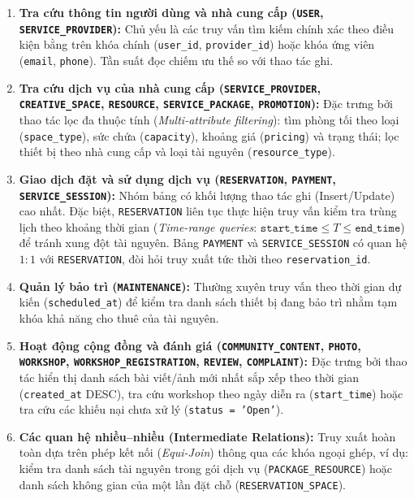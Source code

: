 \begin{enumerate}
    \item \textbf{Tra cứu thông tin người dùng và nhà cung cấp (\texttt{USER}, \texttt{SERVICE\_PROVIDER}):}
    Chủ yếu là các truy vấn tìm kiếm chính xác theo điều kiện bằng trên khóa chính (\texttt{user\_id}, \texttt{provider\_id}) hoặc khóa ứng viên (\texttt{email}, \texttt{phone}). Tần suất đọc chiếm ưu thế so với thao tác ghi.

    \item \textbf{Tra cứu dịch vụ của nhà cung cấp (\texttt{SERVICE\_PROVIDER}, \texttt{CREATIVE\_SPACE}, \texttt{RESOURCE}, \texttt{SERVICE\_PACKAGE}, \texttt{PROMOTION}):}
    Đặc trưng bởi thao tác lọc đa thuộc tính (\textit{Multi-attribute filtering}): tìm phòng tối theo loại (\texttt{space\_type}), sức chứa (\texttt{capacity}), khoảng giá (\texttt{pricing}) và trạng thái; lọc thiết bị theo nhà cung cấp và loại tài nguyên (\texttt{resource\_type}).

    \item \textbf{Giao dịch đặt và sử dụng dịch vụ (\texttt{RESERVATION}, \texttt{PAYMENT}, \texttt{SERVICE\_SESSION}):}
    Nhóm bảng có khối lượng thao tác ghi (Insert/Update) cao nhất. Đặc biệt, \texttt{RESERVATION} liên tục thực hiện truy vấn kiểm tra trùng lịch theo khoảng thời gian (\textit{Time-range queries}: $\texttt{start\_time} \le T \le \texttt{end\_time}$) để tránh xung đột tài nguyên. Bảng \texttt{PAYMENT} và \texttt{SERVICE\_SESSION} có quan hệ $1:1$ với \texttt{RESERVATION}, đòi hỏi truy xuất tức thời theo \texttt{reservation\_id}.

    \item \textbf{Quản lý bảo trì (\texttt{MAINTENANCE}):}
    Thường xuyên truy vấn theo thời gian dự kiến (\texttt{scheduled\_at}) để kiểm tra danh sách thiết bị đang bảo trì nhằm tạm khóa khả năng cho thuê của tài nguyên.

    \item \textbf{Hoạt động cộng đồng và đánh giá (\texttt{COMMUNITY\_CONTENT}, \texttt{PHOTO}, \texttt{WORKSHOP}, \texttt{WORKSHOP\_REGISTRATION}, \texttt{REVIEW}, \texttt{COMPLAINT}):}
    Đặc trưng bởi thao tác hiển thị danh sách bài viết/ảnh mới nhất sắp xếp theo thời gian (\texttt{created\_at} DESC), tra cứu workshop theo ngày diễn ra (\texttt{start\_time}) hoặc tra cứu các khiếu nại chưa xử lý (\texttt{status = 'Open'}).

    \item \textbf{Các quan hệ nhiều--nhiều (Intermediate Relations):}
    Truy xuất hoàn toàn dựa trên phép kết nối (\textit{Equi-Join}) thông qua các khóa ngoại ghép, ví dụ: kiểm tra danh sách tài nguyên trong gói dịch vụ (\texttt{PACKAGE\_RESOURCE}) hoặc danh sách không gian của một lần đặt chỗ (\texttt{RESERVATION\_SPACE}).
\end{enumerate}

